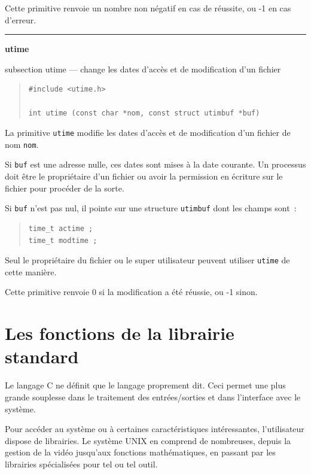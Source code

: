 \documentclass [twoside] {report}
\newcommand {\primitive} [1]
    {
	\phantomsection
	{\large \textbf {#1}}
	\addcontentsline {toc} {subsection} {#1}
    }
\newcommand {\separation}
    {
	\vspace {5mm}
	\nopagebreak
	\hrule
    }
\begin{document}
Cette primitive renvoie un nombre non négatif en
cas de réussite, ou -1 en cas d'erreur.




\separation
\primitive {utime} --- change les dates d'accès et de modification d'un fichier

\begin {quote}
\begin {verbatim}
#include <utime.h>

int utime (const char *nom, const struct utimbuf *buf)
\end{verbatim}
\end {quote}

La primitive \texttt {utime} modifie les dates d'accès
et de modification d'un fichier de nom \texttt {nom}.

Si \texttt {buf} est une adresse nulle, ces dates sont
mises à la date courante. Un processus doit être
le propriétaire d'un fichier ou avoir la
permission en écriture sur le fichier pour
procéder de la sorte.

Si \texttt {buf} n'est pas nul, il pointe sur une
structure \texttt {utimbuf} dont les champs sont~:

\begin {quote}
\begin {verbatim}
time_t actime ;
time_t modtime ;
\end{verbatim}
\end {quote}

Seul le propriétaire du fichier ou le super
utilisateur peuvent utiliser \texttt {utime} de cette
manière.

Cette primitive renvoie 0 si la modification a
été réussie, ou -1 sinon.



\cleardoublepage

\chapter {Les fonctions de la librairie standard}


Le langage C ne définit que le langage proprement dit. Ceci
permet une plus grande souplesse dans le traitement des
entrées/sorties et dans l'interface avec le système.

Pour accéder au système ou à certaines caractéristiques
intéressantes, l'utilisateur dispose de librairies. Le
système UNIX en comprend de nombreuses, depuis la gestion de
la vidéo jusqu'aux fonctions mathématiques, en passant par
les librairies spécialisées pour tel ou tel outil.
\end{document}
